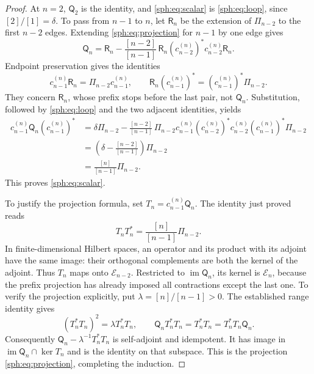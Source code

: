 \begin{proof}
At \(n=2\), \(\mathsf Q_2\) is the identity, and
\eqref{sph:eq:scalar} is \eqref{sph:eq:loop}, since
\([2]/[1]=\delta\).
To pass from \(n-1\) to \(n\), let \(\mathsf R_n\) be the
extension of \(\Pi_{n-2}\) to the first \(n-2\) edges.
Extending \eqref{sph:eq:projection} for \(n-1\) by one edge
gives
\[
 \mathsf Q_n=\mathsf R_n-
       \frac{[n-2]}{[n-1]}\,
       \mathsf R_n(c_{n-2}^{(n)})^*
                    c_{n-2}^{(n)}\mathsf R_n.
\]
Endpoint preservation gives the identities
\[
 c_{n-1}^{(n)}\mathsf R_n
       =\Pi_{n-2}c_{n-1}^{(n)},\qquad
 \mathsf R_n(c_{n-1}^{(n)})^*
       =(c_{n-1}^{(n)})^*\Pi_{n-2}.
\]
They concern \(\mathsf R_n\), whose prefix stops before the
last pair, not \(\mathsf Q_n\).
Substitution, followed by \eqref{sph:eq:loop} and the two
adjacent identities, yields
\begin{align*}
 c_{n-1}^{(n)}\mathsf Q_n(c_{n-1}^{(n)})^*
 &=\delta\Pi_{n-2}
   -\frac{[n-2]}{[n-1]}\,
     \Pi_{n-2}c_{n-1}^{(n)}(c_{n-2}^{(n)})^*
                c_{n-2}^{(n)}(c_{n-1}^{(n)})^*\Pi_{n-2}\\
 &=\left(\delta-\frac{[n-2]}{[n-1]}\right)\Pi_{n-2}\\
 &=\frac{[n]}{[n-1]}\Pi_{n-2}.
\end{align*}
This proves \eqref{sph:eq:scalar}.

To justify the projection formula, set
\(T_n=c_{n-1}^{(n)}\mathsf Q_n\).
The identity just proved reads
\[
 T_nT_n^*=\frac{[n]}{[n-1]}\Pi_{n-2}.
\]
In finite-dimensional Hilbert spaces, an operator and its
product with its adjoint have the same image: their
orthogonal complements are both the kernel of the adjoint.
Thus \(T_n\) maps onto \(\mathcal E_{n-2}\).
Restricted to \(\operatorname{im}\mathsf Q_n\), its kernel
is \(\mathcal E_n\), because the prefix projection has
already imposed all contractions except the last one.
To verify the projection explicitly, put
\(\lambda=[n]/[n-1]>0\).
The established range identity gives
\[
 (T_n^*T_n)^2=\lambda T_n^*T_n,\qquad
 \mathsf Q_nT_n^*T_n=T_n^*T_n
       =T_n^*T_n\mathsf Q_n.
\]
Consequently
\(\mathsf Q_n-\lambda^{-1}T_n^*T_n\) is self-adjoint
and idempotent.  It has image in
\(\operatorname{im}\mathsf Q_n\cap\ker T_n\) and is
the identity on that subspace.  This is the projection
\eqref{sph:eq:projection}, completing the induction.


\end{proof}
